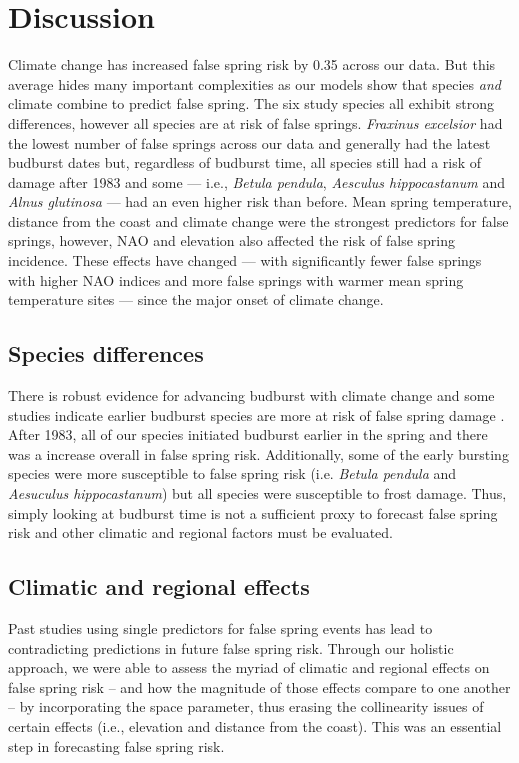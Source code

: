 \documentclass{article}\usepackage[]{graphicx}\usepackage[]{color}
\begin{document}
\section*{Discussion}
Climate change has increased false spring risk by 0.35 across our data. But this average hides many important complexities as our models show that species \textit{and} climate combine to predict false spring. The six study species all exhibit strong differences, however all species are at risk of false springs. \textit{Fraxinus excelsior} had the lowest number of false springs across our data and generally had the latest budburst dates but, regardless of budburst time, all species still had a risk of damage after 1983 and some  --- i.e., \textit{Betula pendula}, \textit{Aesculus hippocastanum} and \textit{Alnus glutinosa} --- had an even higher risk than before. Mean spring temperature, distance from the coast and climate change were the strongest predictors for false springs, however, NAO and elevation also affected the risk of false spring incidence. These effects have changed --- with significantly fewer false springs with higher NAO indices and more false springs with warmer mean spring temperature sites --- since the major onset of climate change. 

\subsection*{Species differences}
There is robust evidence for advancing budburst with climate change \citep{Cleland2007, IPCC2014, Wolkovich2012} and some studies indicate earlier budburst species are more at risk of false spring damage \citep{Ma2018}. After 1983, all of our species initiated budburst earlier in the spring and there was a increase overall in false spring risk. Additionally, some of the early bursting species were more susceptible to false spring risk (i.e. \textit{Betula pendula} and \textit{Aesuculus hippocastanum}) but all species were susceptible to frost damage. Thus, simply looking at budburst time is not a sufficient proxy to forecast false spring risk and other climatic and regional factors must be evaluated.
  
\subsection*{Climatic and regional effects}
Past studies using single predictors for false spring events has lead to contradicting predictions in future false spring risk. Through our holistic approach, we were able to assess the myriad of climatic and regional effects on false spring risk -- and how the magnitude of those effects compare to one another -- by incorporating the space parameter, thus erasing the collinearity issues of certain effects (i.e., elevation and distance from the coast). This was an essential step in forecasting false spring risk. 
\end{document}
